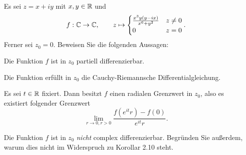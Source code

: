 \begin{Problem}
	Es sei $z=x+iy$ mit $x,y\in \mathbb{R}$ und
	\[
	f:\mathbb{C}\to \mathbb{C},\qquad z\mapsto \begin{cases}
		\frac{x^3y(y-ix)}{x^6+y^2} & z\neq 0\\
		0 & z = 0
	\end{cases}
	.\] 
	Ferner sei $z_0=0$. Beweisen Sie die folgenden Aussagen:
	\begin{parts}
	\item Die Funktion $f$ ist in $z_0$ partiell differenzierbar.
	\item Die Funktion erf\"{u}llt in $z_0$ die Cauchy-Riemannsche Differentialgleichung.
	\item Es sei $t\in \mathbb{R}$ fixiert. Dann besitzt $f$ einen radialen Grenzwert in $z_0$, also es existiert folgender Grenzwert
		\[
			\lim_{r \to 0,r>0} \frac{f(e^{it}r)-f(0)}{e^{it}r}
		.\] 
	\item Die Funktion $f$ ist in $z_0$ \emph{nicht} complex differenzierbar. Begr\"{u}nden Sie außerdem, warum dies nicht im Widerspruch zu Korollar 2.10 steht.
	\end{parts}
\end{Problem}
